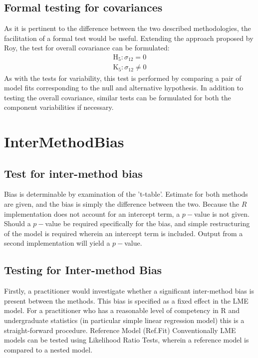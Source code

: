 \documentclass[12pt, a4paper]{report}
\theoremstyle{plain}
\theoremstyle{definition}
\theoremstyle{remark}
\begin{document}
\section{Formal testing for covariances }
As it is pertinent to the difference between the two described methodologies, the facilitation of a formal test would be useful. Extending the approach proposed by Roy, the test for overall covariance can be formulated:
\begin{eqnarray*}
	\operatorname{H_5} : \sigma_{12} = 0 \\
	\operatorname{K_5} : \sigma_{12} \neq 0
\end{eqnarray*}
As with the tests for variability, this test is performed by comparing a pair of model fits corresponding to the null and alternative hypothesis. In addition to testing the overall covariance, similar tests can be formulated for both the component variabilities if necessary.

	
	
	
\chapter{InterMethodBias}

\section{Test for inter-method bias}
Bias is determinable by examination of the 't-table'. Estimate for both methods are given, and the bias is simply the difference between the two. Because the $R$ implementation does not account for an intercept term, a $p-$value is not given. Should a $p-$value be required specifically for the bias, and simple restructuring of the model is required wherein an intercept term is included. Output from a second implementation will yield a $p-$value.
\section{Testing for Inter-method Bias}
	Firstly, a practitioner would investigate whether a significant inter-method bias is present between the methods. This bias is specified as a fixed effect in the LME model.  For a practitioner who has a reasonable level of competency in R and undergraduate statistics (in particular simple linear regression model) this is a straight-forward procedure.
	Reference Model (Ref.Fit)
	Conventionally LME models can be tested using Likelihood Ratio Tests, wherein a reference model is compared to a nested model.
	
\end{document}
